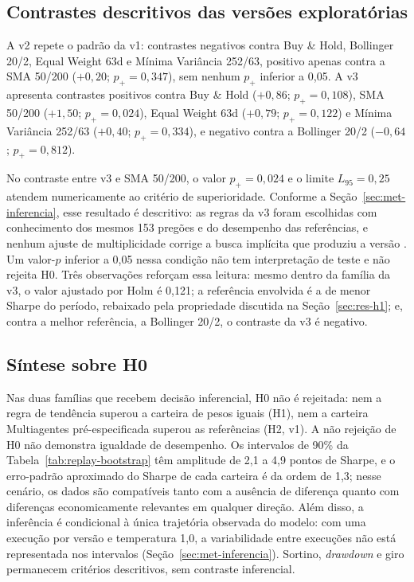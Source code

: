 \subsection{Contrastes descritivos das versões exploratórias}
\label{sec:res-h2-exploratorio}

A v2 repete o padrão da v1: contrastes negativos contra Buy \& Hold, Bollinger 20/2, Equal Weight 63d e Mínima Variância 252/63, positivo apenas contra a SMA 50/200 ($+0{,}20$; $p_{+} = 0{,}347$), sem nenhum $p_{+}$ inferior a 0,05. A v3 apresenta contrastes positivos contra Buy \& Hold ($+0{,}86$; $p_{+} = 0{,}108$), SMA 50/200 ($+1{,}50$; $p_{+} = 0{,}024$), Equal Weight 63d ($+0{,}79$; $p_{+} = 0{,}122$) e Mínima Variância 252/63 ($+0{,}40$; $p_{+} = 0{,}334$), e negativo contra a Bollinger 20/2 ($-0{,}64$; $p_{+} = 0{,}812$).

No contraste entre v3 e SMA 50/200, o valor $p_{+} = 0{,}024$ e o limite $L_{95} = 0{,}25$ atendem numericamente ao critério de superioridade. Conforme a Seção~\ref{sec:met-inferencia}, esse resultado é descritivo: as regras da v3 foram escolhidas com conhecimento dos mesmos 153 pregões e do desempenho das referências, e nenhum ajuste de multiplicidade corrige a busca implícita que produziu a versão \citep{White2000, Bailey2017}. Um valor-$p$ inferior a 0,05 nessa condição não tem interpretação de teste e não rejeita H0. Três observações reforçam essa leitura: mesmo dentro da família da v3, o valor ajustado por Holm é 0,121; a referência envolvida é a de menor Sharpe do período, rebaixado pela propriedade discutida na Seção~\ref{sec:res-h1}; e, contra a melhor referência, a Bollinger 20/2, o contraste da v3 é negativo.

\subsection{Síntese sobre H0}
\label{sec:res-h0}

Nas duas famílias que recebem decisão inferencial, H0 não é rejeitada: nem a regra de tendência superou a carteira de pesos iguais (H1), nem a carteira Multiagentes pré-especificada superou as referências (H2, v1). A não rejeição de H0 não demonstra igualdade de desempenho. Os intervalos de 90\% da Tabela~\ref{tab:replay-bootstrap} têm amplitude de 2,1 a 4,9 pontos de Sharpe, e o erro-padrão aproximado do Sharpe de cada carteira é da ordem de 1,3; nesse cenário, os dados são compatíveis tanto com a ausência de diferença quanto com diferenças economicamente relevantes em qualquer direção. Além disso, a inferência é condicional à única trajetória observada do modelo: com uma execução por versão e temperatura 1,0, a variabilidade entre execuções não está representada nos intervalos (Seção~\ref{sec:met-inferencia}). Sortino, \textit{drawdown} e giro permanecem critérios descritivos, sem contraste inferencial.

